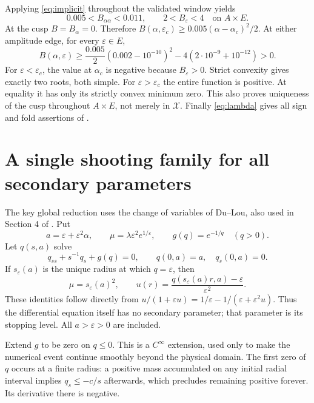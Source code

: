 \documentclass[11pt,a4paper]{report}
\begin{document}
Applying \eqref{eq:implicit} throughout the validated window yields
\begin{equation}\label{eq:convexity}
 0.005<B_{\alpha\alpha}<0.011,
 \qquad 2<B_\varepsilon<4\quad\text{on }A\times E.
\end{equation}
At the cusp $B=B_\alpha=0$. Therefore
$B(\alpha,\varepsilon_c)\geq0.005(\alpha-\alpha_c)^2/2$.
At either amplitude edge, for every $\varepsilon\in E$,
\[
 B(\alpha,\varepsilon)
 \geq\frac{0.005}{2}(0.002-10^{-10})^2
       -4(2\cdot10^{-9}+10^{-12})>0.
\]
For $\varepsilon<\varepsilon_c$, the value at $\alpha_c$ is negative because
$B_\varepsilon>0$. Strict convexity gives exactly two roots, both simple.
For $\varepsilon>\varepsilon_c$ the entire function is positive. At equality
it has only its strictly convex minimum zero. This also proves uniqueness
of the cusp throughout $A\times E$, not merely in $\mathcal X$.
Finally \eqref{eq:lambda} gives all sign and fold assertions of
.

\section{A single shooting family for all secondary parameters}
The key global reduction uses the change of variables of Du--Lou, also used
in Section 4 of \autocite{KLO2017}. Put
\[
 a=\varepsilon+\varepsilon^2\alpha,\qquad
 \mu=\lambda\varepsilon^2e^{1/\varepsilon},\qquad
 g(q)=e^{-1/q}\quad(q>0).
\]
Let $q(s,a)$ solve
\begin{equation}\label{eq:reduced}
 q_{ss}+s^{-1}q_s+g(q)=0,\qquad q(0,a)=a,\quad q_s(0,a)=0.
\end{equation}
If $s_\varepsilon(a)$ is the unique radius at which $q=\varepsilon$, then
\begin{equation}\label{eq:reconstruct}
 \mu=s_\varepsilon(a)^2,\qquad
 u(r)=\frac{q(s_\varepsilon(a)r,a)-\varepsilon}{\varepsilon^2}.
\end{equation}
These identities follow directly from
$u/(1+\varepsilon u)=1/\varepsilon-1/(\varepsilon+\varepsilon^2u)$.
Thus the differential equation itself has no secondary parameter; that
parameter is its stopping level. All $a>\varepsilon>0$ are included.

Extend $g$ to be zero on $q\leq0$. This is a $C^\infty$ extension, used only
to make the numerical event continue smoothly beyond the physical domain.
The first zero of $q$ occurs at a finite radius: a positive mass accumulated
on any initial radial interval implies $q_s\leq-c/s$ afterwards, which
precludes remaining positive forever. Its derivative there is negative.
\end{document}
